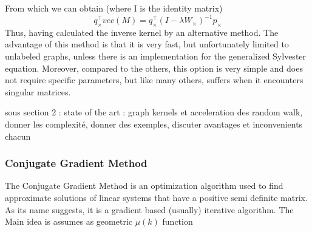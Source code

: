\documentclass{article}
\theoremstyle{definition}
\begin{document}
From which we can obtain (where I is the identity matrix)
\begin{equation}
	q_{\times}^{\top}vec(M)=q_{\times}^{\top}(I-\lambda W_{\times})^{-1}p_{\times}
\end{equation}
Thus, having calculated the inverse kernel by an alternative method. The advantage of this method is that it is very fast, but unfortunately limited to unlabeled graphs, unless there is an implementation for the generalized Sylvester equation. Moreover, compared to the others, this option is very simple and does not require specific parameters, but like many others, suffers when it encounters singular matrices. 

sous section 2 : state of the art : graph kernels et acceleration des random walk, donner les complexité, donner des exemples, discuter avantages et inconvenients chacun
\subsubsection{Conjugate Gradient Method}
The Conjugate Gradient Method is an optimization algorithm used to find approximate solutions of linear systems that have a positive semi definite matrix. As its name suggests, it is a gradient based (usually) iterative algorithm. The Main idea is  
assumes as geometric $\mu(k)$ function
\end{document}
